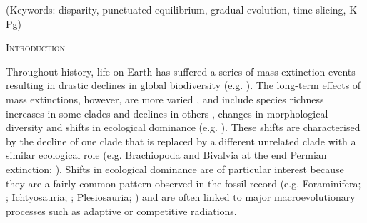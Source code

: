 \documentclass[12pt,letterpaper]{article}
\renewcommand{\section}[1]{%
\bigskip
\begin{center}
\begin{Large}
\normalfont\scshape #1
\medskip
\end{Large}
\end{center}}
\begin{document}
\noindent (Keywords: disparity, punctuated equilibrium, gradual evolution, time slicing, K-Pg)\\

\vspace{1.5in}

\newpage 

%
%

\section{Introduction}
Throughout history, life on Earth has suffered a series of mass extinction events resulting in drastic declines in global biodiversity (e.g. \cite{RaupPT,BentonPT,rennetime2013,Brusatte2015}).
The long-term effects of mass extinctions, however, are more varied \cite{Erwin1998344}, and include species richness increases in some clades \cite{friedmanexplosive2010} and declines in others \cite{Brusatte2015}
, changes in morphological diversity \cite{kornextinction2013} and shifts in ecological dominance (e.g. \cite{Brusatte12092008,toljagictriassic-jurassic2013,bensonfaunal2014}).
These shifts are characterised by the decline of one clade that is replaced by a different unrelated clade with a similar ecological role (e.g. Brachiopoda and Bivalvia at the end Permian extinction; \cite{Liow2015}).
Shifts in ecological dominance are of particular interest because they are a fairly common pattern observed in the fossil record (e.g. Foraminifera; \cite{Coxall01042006}; Ichtyosauria; \cite{thorneresetting2011}; Plesiosauria; \cite{bensonfaunal2014}) and are often linked to major macroevolutionary processes such as adaptive \cite{Losos2010} or competitive \cite{Brusatte12092008} radiations.
\end{document}
